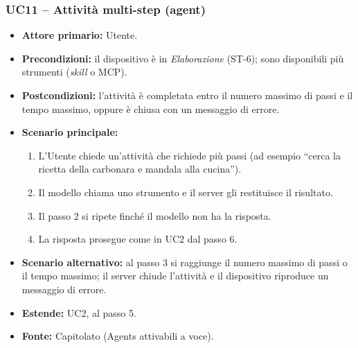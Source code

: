 \documentclass[12pt,a4paper]{article}
\newcommand{\tightlist}{\setlength{\itemsep}{1pt}\setlength{\parskip}{0pt}}
\begin{document}
\subsubsection{UC11 -- Attività multi-step (agent)}

\begin{itemize}

\tightlist

\item \textbf{Attore primario:} Utente.

\item \textbf{Precondizioni:} il dispositivo è in \emph{Elaborazione} (ST-6); sono disponibili più strumenti (\emph{skill} o MCP).

\item \textbf{Postcondizioni:} l'attività è completata entro il numero massimo di passi e il tempo massimo, oppure è chiusa con un messaggio di errore.

\item \textbf{Scenario principale:}

\begin{enumerate}

\tightlist

\item L'Utente chiede un'attività che richiede più passi (ad esempio ``cerca la ricetta della carbonara e mandala alla cucina'').

\item Il modello chiama uno strumento e il server gli restituisce il risultato.

\item Il passo 2 si ripete finché il modello non ha la risposta.

\item La risposta prosegue come in UC2 dal passo 6.

\end{enumerate}

\item \textbf{Scenario alternativo:} al passo 3 si raggiunge il numero massimo di passi o il tempo massimo; il server chiude l'attività e il dispositivo riproduce un messaggio di errore.

\item \textbf{Estende:} UC2, al passo 5.

\item \textbf{Fonte:} Capitolato (Agents attivabili a voce).

\end{itemize}
\end{document}
